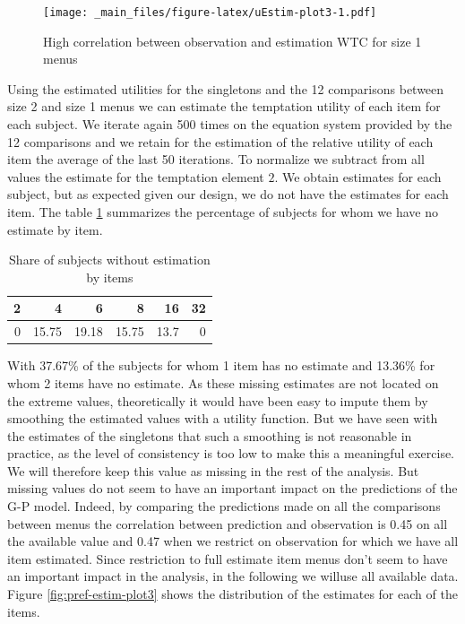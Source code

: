 \documentclass[
]{book}
\begin{document}
\begin{figure}
\centering
\texttt{[image: \_main\_files/figure-latex/uEstim-plot3-1.pdf]}
\caption{\label{fig:uEstim-plot3}High correlation between observation and estimation WTC for size 1 menus}
\end{figure}

Using the estimated utilities for the singletons and the 12 comparisons between
size 2 and size 1 menus we can estimate the temptation utility of each item for
each subject.
We iterate again 500 times on the equation system provided by the 12 comparisons
and we retain for the estimation of the relative utility of each item the
average of the last 50 iterations.
To normalize we subtract from all values the estimate for the temptation element
\(2\).
We obtain estimates for each subject, but as expected given our design, we do not
have the estimates for each item.
The table \ref{tab:no-estim3} summarizes the percentage of subjects for whom we
have no estimate by item.

\begin{table}

\caption{\label{tab:no-estim3}Share of subjects without estimation by items}
\centering
\begin{tabular}[t]{r|r|r|r|r|r}
\hline
2 & 4 & 6 & 8 & 16 & 32\\
\hline
0 & 15.75 & 19.18 & 15.75 & 13.7 & 0\\
\hline
\end{tabular}
\end{table}

With 37.67\% of the subjects for whom 1 item has no
estimate and 13.36\% for whom 2 items have no estimate.
As these missing estimates are not located on the extreme values, theoretically
it would have been easy to impute them by smoothing the estimated values with a
utility function.
But we have seen with the estimates of the singletons that such a smoothing is
not reasonable in practice, as the level of consistency is too low to make this
a meaningful exercise.
We will therefore keep this value as missing in the rest of the analysis.
But missing values do not seem to have an
important impact on the predictions of the G-P model.
Indeed, by comparing the predictions made on all the comparisons between menus
the correlation between prediction and observation is
0.45 on all the available
value and
0.47
when we restrict on observation for which we have all item estimated.
Since restriction to full estimate item menus don't seem to have an important
impact in the analysis, in the following we willuse all available data.
Figure \ref{fig:pref-estim-plot3} shows the distribution of the estimates
for each of the items.
\end{document}
